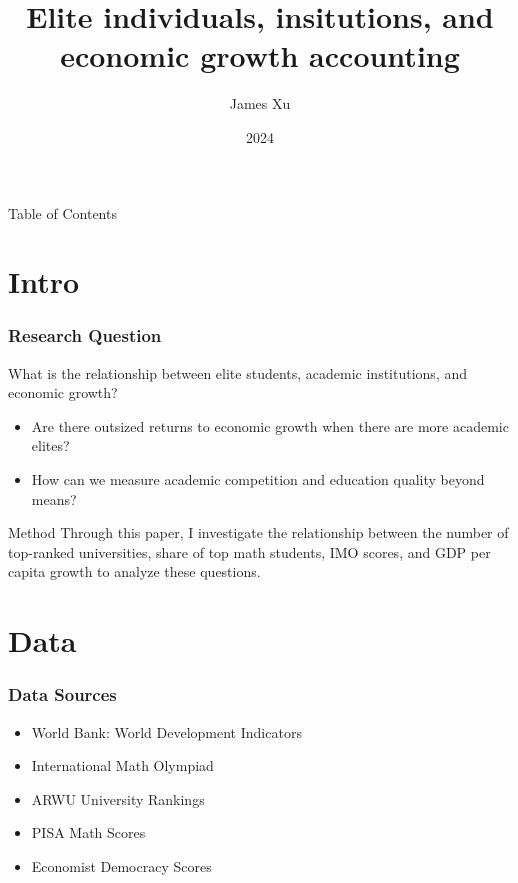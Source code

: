 \documentclass[10pt]{beamer}
\title{Elite individuals, insitutions, and economic growth accounting}
\author{James Xu}
\institute{ECON 442, Duke University}
\date{2024}
\begin{document}

\frame{\titlepage}

\begin{frame}{Table of Contents}
    \tableofcontents
\end{frame}
\section{Intro}
\begin{frame}
    \frametitle{Research Question}
    \begin{block}{What is the relationship between elite students, academic institutions, and economic growth?}
        \begin{itemize}
            \item Are there outsized returns to economic growth when there are more academic elites?
            \item How can we measure academic competition and education quality beyond means?
        \end{itemize}
    \end{block}
    \begin{exampleblock}{Method}
        Through this paper, I investigate the relationship between the number of top-ranked universities, share of top math students,
        IMO scores, and GDP per capita growth to analyze these questions.
    \end{exampleblock}
\end{frame}

\section{Data}
\begin{frame}
\frametitle{Data Sources}
\begin{itemize}
    \item World Bank: World Development Indicators
    \item International Math Olympiad
    \item ARWU University Rankings
    \item PISA Math Scores
    \item Economist Democracy Scores
\end{itemize}
\end{frame}
\end{document}
